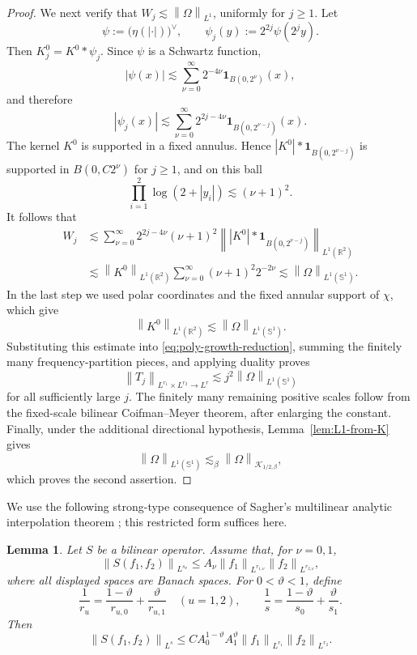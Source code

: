 \documentclass[11pt]{amsart}
\newtheorem{lemma}[definition]{Lemma}
\theoremstyle{remark}
\numberwithin{equation}{section}
\newcommand{\R}{\mathbb R}
\newcommand{\Sph}{\mathbb S^1}
\newcommand{\cK}{\mathcal K}
\newcommand{\norm}[1]{\left\lVert #1\right\rVert}
\newcommand{\one}{\mathbf 1}
\begin{document}
\begin{proof}
		We next verify that
		\(W_j\lesssim\norm{\Omega}_{L^1}\), uniformly for \(j\ge1\). Let
		\[
		\psi:=\bigl(\eta(|\cdot|)\bigr)^\vee,
		\qquad
		\psi_j(y):=2^{2j}\psi(2^jy).
		\]
		Then \(K_j^0=K^0*\psi_j\). Since \(\psi\) is a Schwartz function,
		\[
		|\psi(x)|
		\lesssim
		\sum_{\nu=0}^\infty
		2^{-4\nu}\one_{B(0,2^\nu)}(x),
		\]
		and therefore
		\[
		|\psi_j(x)|
		\lesssim
		\sum_{\nu=0}^\infty
		2^{2j-4\nu}\one_{B(0,2^{\nu-j})}(x).
		\]
		The kernel \(K^0\) is supported in a fixed annulus. Hence
		\(|K^0|*\one_{B(0,2^{\nu-j})}\) is supported in
		\(B(0,C2^\nu)\) for \(j\ge1\), and on this ball
		\[
		\prod_{i=1}^2\log(2+|y_i|)\lesssim(\nu+1)^2.
		\]
		It follows that
		\begin{align*}
			W_j
			&\lesssim
			\sum_{\nu=0}^\infty
			2^{2j-4\nu}(\nu+1)^2
			\norm{|K^0|*\one_{B(0,2^{\nu-j})}}_{L^1(\R^2)}
			\\
			&\lesssim
			\norm{K^0}_{L^1(\R^2)}
			\sum_{\nu=0}^\infty(\nu+1)^2 2^{-2\nu}
			\lesssim
			\norm{\Omega}_{L^1(\Sph)}.
		\end{align*}
		In the last step we used polar coordinates and the fixed annular support of
		\(\chi\), which give
		\[
		\norm{K^0}_{L^1(\R^2)}
		\lesssim\norm{\Omega}_{L^1(\Sph)}.
		\]
		Substituting this estimate into \eqref{eq:poly-growth-reduction}, summing
		the finitely many frequency-partition pieces, and applying duality proves
		\[
		\norm{T_j}_{L^{r_1}\times L^{r_2}\to L^r}
		\lesssim
		j^2\norm{\Omega}_{L^1(\Sph)}
		\]
		for all sufficiently large \(j\).  The finitely many remaining positive
		scales follow from the fixed-scale bilinear Coifman--Meyer theorem, after
		enlarging the constant. Finally, under the additional directional
		hypothesis, Lemma~\ref{lem:L1-from-K} gives
		\[
		\norm{\Omega}_{L^1(\Sph)}
		\lesssim_\beta
		\norm{\Omega}_{\cK_{1/2,\beta}},
		\]
		which proves the second assertion.
	\end{proof}
	
	We use the following strong-type consequence of Sagher's multilinear analytic
	interpolation theorem \cite{Sagher1969}; this restricted form suffices here.
	
	\begin{lemma}\label{lem:sagher}
		Let \(S\) be a bilinear operator. Assume that, for \(\nu=0,1\),
		\[
		\norm{S(f_1,f_2)}_{L^{s_\nu}}
		\le A_\nu
		\norm{f_1}_{L^{r_{1,\nu}}}
		\norm{f_2}_{L^{r_{2,\nu}}},
		\]
		where all displayed spaces are Banach spaces.  For
		\(0<\vartheta<1\), define
		\[
		\frac1{r_u}
		=\frac{1-\vartheta}{r_{u,0}}+\frac{\vartheta}{r_{u,1}}
		\quad(u=1,2),
		\qquad
		\frac1s=\frac{1-\vartheta}{s_0}+\frac{\vartheta}{s_1}.
		\]
		Then
		\[
		\norm{S(f_1,f_2)}_{L^s}
		\le C A_0^{1-\vartheta}A_1^\vartheta
		\norm{f_1}_{L^{r_1}}\norm{f_2}_{L^{r_2}}.
		\]
	\end{lemma}
	
\end{document}
